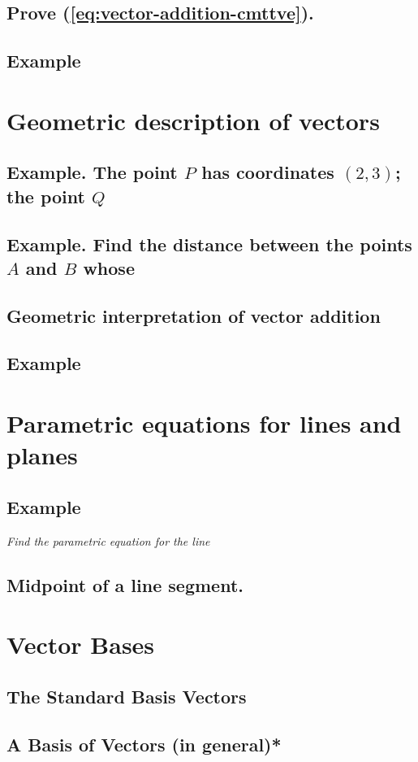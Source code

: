 \subsection{Prove (\ref{eq:vector-addition-cmttve}). }
\subsection{Example}\label{ex:linear-combinations}
\section{Geometric description of vectors}
\subsection{Example. The point $P$ has coordinates $(2,3)$; the point $Q$}
\subsection{Example. Find the distance between the points $A$ and $B$ whose}
\subsection{Geometric interpretation of vector addition}
\subsection{Example}\label{ex:linear-combinations-picture}
\section{Parametric equations for lines and planes}
\subsection{Example} \textit{Find the parametric equation for the line}
\subsection{Midpoint of a line segment. }
\section{Vector Bases}
\subsection{The Standard Basis Vectors}
\subsection{A Basis of Vectors (in general)*}
